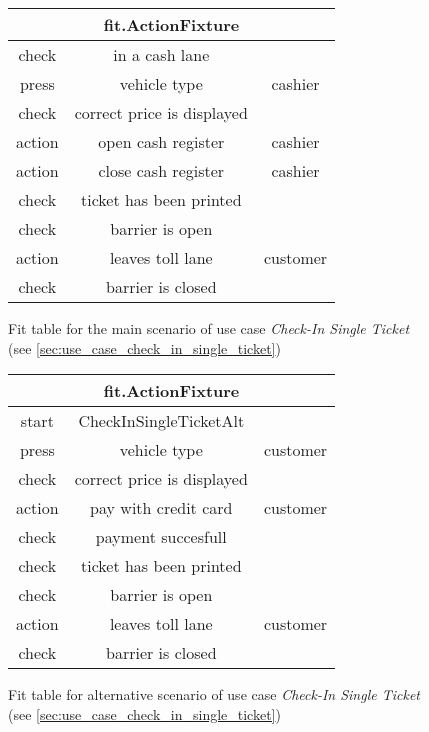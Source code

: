 \begin{figure}[H]
\begin{centering}
\begin{tabular}{|c|c|c|}
\hline 
\multicolumn{3}{|c|}{fit.ActionFixture} \tabularnewline\hline 
check & in a cash lane & \tabularnewline
\hline 
press & vehicle type & cashier\tabularnewline
\hline 
check & correct price is displayed & \tabularnewline
\hline 
action & open cash register & cashier\tabularnewline
\hline 
action & close cash register & cashier\tabularnewline
\hline 
check & ticket has been printed & \tabularnewline
\hline 
check & barrier is open & \tabularnewline
\hline 
action & leaves toll lane & customer\tabularnewline
\hline 
check & barrier is closed & \tabularnewline
\hline 
\end{tabular}
\caption{Fit table for the main scenario of use case \emph{Check-In Single Ticket} (see \autoref{sec:use_case_check_in_single_ticket})}
\end{centering}
\end{figure}

\begin{figure}[H]
\begin{centering}
\begin{tabular}{|c|c|c|}
\hline 
\multicolumn{3}{|c|}{fit.ActionFixture} \tabularnewline\hline 
start & CheckInSingleTicketAlt & \tabularnewline
\hline 
press & vehicle type & customer\tabularnewline
\hline 
check & correct price is displayed & \tabularnewline
\hline 
action & pay with credit card & customer\tabularnewline
\hline 
check & payment succesfull & \tabularnewline
\hline 
check & ticket has been printed & \tabularnewline
\hline 
check & barrier is open & \tabularnewline
\hline 
action & leaves toll lane & customer\tabularnewline
\hline 
check & barrier is closed & \tabularnewline
\hline 
\end{tabular}
\caption{Fit table for alternative scenario of use case \emph{Check-In Single Ticket} (see \autoref{sec:use_case_check_in_single_ticket})}
\end{centering}
\end{figure}
